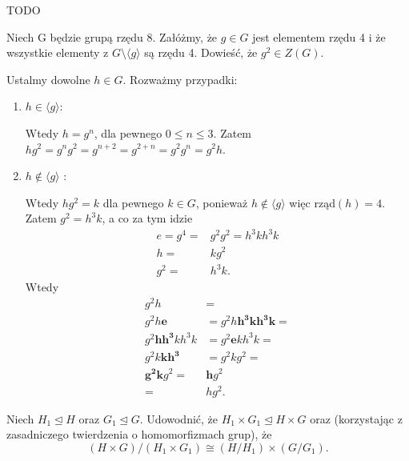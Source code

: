 \begin{solution}
	
	TODO
\end{solution} 
\begin{problem}[7]
	
	Niech G będzie grupą rzędu 8. Załóżmy, że $g\in G$ jest elementem rzędu 4 i że wszystkie elementy z $G\setminus\langle g \rangle $ są rzędu 4. Dowieść, że $g^2 \in Z\left( G \right) $.
\end{problem} 
\begin{solution}
	
	Ustalmy dowolne $h\in G$. Rozważmy przypadki:
	\begin{enumerate}[label=\arabic*.]
		\item $h\in \langle g \rangle $:

			Wtedy $h = g^{n}$, dla pewnego $0\le n\le 3$. Zatem $hg^2 = g^{n}g^2 = g^{n+2} = g^{2+n} = g^2g^{n} = g^2h$.
		\item $h\not\in \langle g \rangle $ :

			Wtedy $hg^2 = k$ dla pewnego $k \in G$, ponieważ $h\not\in \langle g \rangle $ więc rząd$\left( h \right) = 4$. Zatem $g^2 = h^3k$, a co za tym idzie 
			\begin{align*}
				e = g^{4} =& g^2g^2 = h^3kh^3k\\
				h =& kg^2 \\
				g^2 =& h^3k
			.\end{align*}
			Wtedy 
			\begin{align*}
				g^2h &= \\
				g^2h\bm{e} &= g^2h\bm{h^3kh^3k} = \\
				g^2\bm{hh^3}kh^3k &= g^2\bm{e}kh^3k = \\
				g^2 k\bm{kh^3} &= g^2kg^2 = \\
				\bm{g^2k}g^2 =& \bm{h}g^2\\
					=& hg^2
			.\end{align*}
	\end{enumerate}
\end{solution} 
\begin{problem}[8]
	
	Niech $H_1\unlhd H$ oraz $G_1\unlhd G$. Udowodnić, że $H_1\times G_1 \unlhd H\times G$ oraz (korzystając z zasadniczego twierdzenia o homomorfizmach grup), że 
	\[
		\left( H\times G \right) / \left( H_1\times G_1 \right)\cong \left( H /H_1\right) \times \left( G / G_1 \right)   
	.\] 
\end{problem} 
